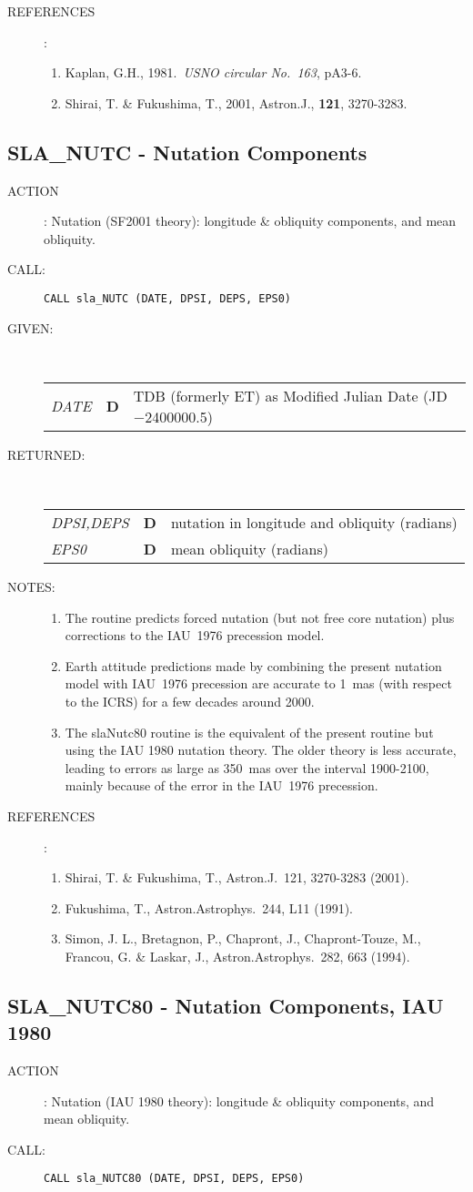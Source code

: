 \documentclass[11pt,twoside]{article}
\newcommand{\xlabel}[1]{}
\newcommand{\routine}[3]
{\hbadness=10000
  \vbox
  {
    \rule{\textwidth}{0.3mm}\\
    {\Large {\bf #1} \hfill #2 \hfill {\bf #1}}\\
    \setlength{\oldspacing}{\topsep}
    \setlength{\topsep}{0.3ex}
    \begin{description}
      #3
    \end{description}
    \setlength{\topsep}{\oldspacing}
  }
}
\renewcommand{\routine}[3]
   {
      \subsection{#1\xlabel{#1} - #2\label{#1}}
       \begin{description}
         #3
       \end{description}
   }
\newcommand{\action}[1]
{\item[ACTION]: #1}
\newcommand{\action}[1]
   {\item[ACTION:] #1}
\newcommand{\call}[1]
{\item[CALL]: \hspace{0.4em}{\tt #1}}
\newlength{\oldspacing}
\renewcommand{\call}[1]
   {
    \item[CALL:] {\tt #1}
   }
\newcommand{\args}[2]
{
  \goodbreak
  \setlength{\oldspacing}{\topsep}
  \setlength{\topsep}{0.3ex}
  \begin{description}
  \item[#1]:\\[1.5ex]
    \begin{tabular}{p{7em}p{6em}p{22em}}
      #2
    \end{tabular}
  \end{description}
  \setlength{\topsep}{\oldspacing}
}
\renewcommand{\args}[2]
   {
     \begin{description}
        \item[#1:]\\
        \begin{tabular}{p{7em}p{6em}l}
           #2
        \end{tabular}
     \end{description}
   }
\newcommand{\spec}[3]
{
  {\em {#1}} & {\bf \mbox{#2}} & {#3}
}
\newcommand{\notes}[1]
{
  \goodbreak
  \setlength{\oldspacing}{\topsep}
  \setlength{\topsep}{0.3ex}
  \begin{description}
    \item[NOTES]:
        #1
  \end{description}
  \setlength{\topsep}{\oldspacing}
}
\renewcommand{\notes}[1]
   {
      \begin{description}
         \item[NOTES:]
            #1
      \end{description}
   }
\newcommand{\refs}[1]
{
  \goodbreak
  \setlength{\oldspacing}{\topsep}
  \setlength{\topsep}{0.3ex}
  \begin{description}
    \item[REFERENCES]:
        #1
  \end{description}
  \setlength{\topsep}{\oldspacing}
}
\newcommand{\refs}[1]
   {
     \begin{description}
       \item[REFERENCES:]
           #1
     \end{description}
   }
\begin{document}
\refs
{
 \begin{enumerate}
  \item Kaplan, G.H., 1981.\ {\it USNO circular No.\ 163}, pA3-6.
  \item Shirai, T. \& Fukushima, T., 2001, Astron.J., {\bf 121},
        3270-3283.
 \end{enumerate}
}
\routine{SLA\_NUTC}{Nutation Components}
{
 \action{Nutation (SF2001 theory):  longitude \& obliquity
         components, and mean obliquity.}
 \call{CALL sla\_NUTC (DATE, DPSI, DEPS, EPS0)}
}
\args{GIVEN}
{
 \spec{DATE}{D}{TDB (formerly ET) as Modified Julian Date
                                           (JD$-$2400000.5)}
}
\args{RETURNED}
{
 \spec{DPSI,DEPS}{D}{nutation in longitude and obliquity (radians)} \\
 \spec{EPS0}{D}{mean obliquity (radians)}
}
\notes
{
 \begin{enumerate}
  \item The routine predicts forced nutation (but not free core nutation)
        plus corrections to the IAU~1976 precession model.
  \item Earth attitude predictions made by combining the present nutation
        model with IAU~1976 precession are accurate to 1~mas (with respect
        to the ICRS) for a few decades around 2000.
  \item The slaNutc80 routine is the equivalent of the present routine
        but using the IAU 1980 nutation theory.  The older theory is less
        accurate, leading to errors as large as 350~mas over the interval
        1900-2100, mainly because of the error in the IAU~1976 precession.
 \end{enumerate}
}
\refs
{
 \begin{enumerate}
  \item Shirai, T. \& Fukushima, T., Astron.J.\ 121, 3270-3283 (2001).
  \item Fukushima, T., Astron.Astrophys.\ 244, L11 (1991).
  \item Simon, J. L., Bretagnon, P., Chapront, J., Chapront-Touze, M.,
        Francou, G. \& Laskar, J., Astron.Astrophys.\ 282, 663 (1994).
 \end{enumerate}
}
\routine{SLA\_NUTC80}{Nutation Components, IAU 1980}
{
 \action{Nutation (IAU 1980 theory):  longitude \& obliquity
         components, and mean obliquity.}
 \call{CALL sla\_NUTC80 (DATE, DPSI, DEPS, EPS0)}
}
\end{document}
